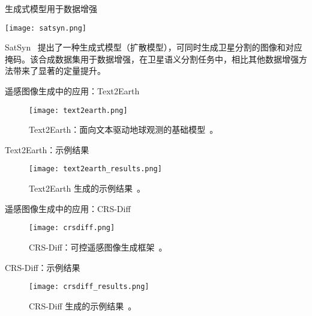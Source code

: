   
\begin{refsection}
\begin{frame}{生成式模型用于数据增强}
  \begin{minipage}{0.7\linewidth}
    \texttt{[image: satsyn.png]}
  \end{minipage}%
  \hfill
  \begin{minipage}{0.3\linewidth}
    \scriptsize
    SatSyn~\parencite{tokerSatSynthAugmentingImageMask2024} 提出了一种生成式模型（扩散模型），可同时生成卫星分割的图像和对应掩码。该合成数据集用于数据增强，在卫星语义分割任务中，相比其他数据增强方法带来了显著的定量提升。
  \end{minipage}
  \bottomleftrefs
\end{frame}
\end{refsection}

\begin{refsection}
\begin{frame}{遥感图像生成中的应用：Text2Earth}
  \begin{figure}
    \centering
    \texttt{[image: text2earth.png]}
    \caption[]{\scriptsize Text2Earth：面向文本驱动地球观测的基础模型~\parencite{text2earth2025}。}
  \end{figure}
  \bottomleftrefs
\end{frame}
\end{refsection}

\begin{refsection}
\begin{frame}{Text2Earth：示例结果}
  \begin{figure}
    \centering
    \texttt{[image: text2earth\_results.png]}
    \caption[]{\scriptsize Text2Earth 生成的示例结果~\parencite{text2earth2025}。}
  \end{figure}
  \bottomleftrefs
\end{frame}
\end{refsection}

\begin{refsection}
\begin{frame}{遥感图像生成中的应用：CRS-Diff}
\begin{figure}
  \centering
  \texttt{[image: crsdiff.png]}
  \caption[]{\scriptsize CRS-Diff：可控遥感图像生成框架~\parencite{tang2024crsdiff}。}
\end{figure}
\bottomleftrefs
\end{frame}
\end{refsection}

\begin{refsection}
\begin{frame}{CRS-Diff：示例结果}
\begin{figure}
  \centering
  \texttt{[image: crsdiff\_results.png]}
  \caption[]{\scriptsize CRS-Diff 生成的示例结果~\parencite{tang2024crsdiff}。}
\end{figure}
\bottomleftrefs
\end{frame}
\end{refsection}